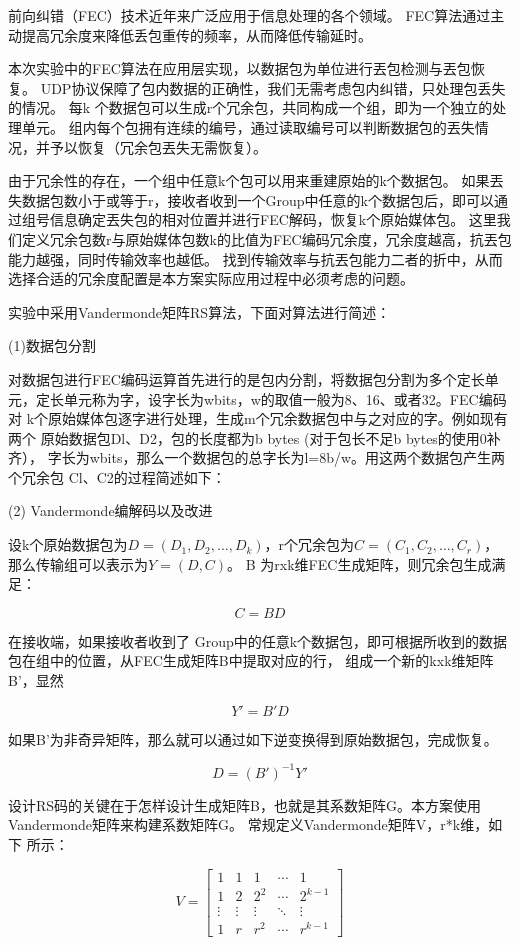 \documentclass[onecolumn]{article}
\begin{document}
\begin{CJK*}{UTF8}{gbsn}
前向纠错（FEC）技术近年来广泛应用于信息处理的各个领域。
FEC算法通过主动提高冗余度来降低丢包重传的频率，从而降低传输延时。

本次实验中的FEC算法在应用层实现，以数据包为单位进行丟包检测与丟包恢复。
UDP协议保障了包内数据的正确性，我们无需考虑包内纠错，只处理包丢失的情况。
每k 个数据包可以生成r个冗余包，共同构成一个组，即为一个独立的处理单元。
组内每个包拥有连续的编号，通过读取编号可以判断数据包的丟失情况，并予以恢复（冗余包丟失无需恢复）。 

由于冗余性的存在，一个组中任意k个包可以用来重建原始的k个数据包。
如果丟失数据包数小于或等于r，接收者收到一个Group中任意的k个数据包后，即可以通过组号信息确定丟失包的相对位置并进行FEC解码，恢复k个原始媒体包。
这里我们定义冗余包数r与原始媒体包数k的比值为FEC编码冗余度，冗余度越高，抗丟包能力越强，同时传输效率也越低。
找到传输效率与抗丟包能力二者的折中，从而 选择合适的冗余度配置是本方案实际应用过程中必须考虑的问题。

实验中采用Vandermonde矩阵RS算法，下面对算法进行简述：

 (1)数据包分割
 
对数据包进行FEC编码运算首先进行的是包内分割，将数据包分割为多个定长单元，定长单元称为字，设字长为wbits，w的取值一般为8、16、或者32。FEC编码对 k个原始媒体包逐字进行处理，生成m个冗余数据包中与之对应的字。例如现有两个 原始数据包Dl、D2，包的长度都为b bytes (对于包长不足b bytes的使用0补齐）， 字长为wbits，那么一个数据包的总字长为l=8b/w。用这两个数据包产生两个冗余包 Cl、C2的过程简述如下：

(2) Vandermonde编解码以及改进

设k个原始数据包为$D= (D_1,D_2,\dots,D_k)$，r个冗余包为$C=(C_1,C_2,\dots,C_r)$，那么传输组可以表示为$Y= (D,C)$。
B 为rxk维FEC生成矩阵，则冗余包生成满足：

$$C=BD$$

在接收端，如果接收者收到了 Group中的任意k个数据包，即可根据所收到的数据包在组中的位置，从FEC生成矩阵B中提取对应的行， 组成一个新的kxk维矩阵B’，显然

$$Y'=B'D$$

如果B’为非奇异矩阵，那么就可以通过如下逆变换得到原始数据包，完成恢复。

$$D=(B')^{-1}Y'$$

设计RS码的关键在于怎样设计生成矩阵B，也就是其系数矩阵G。本方案使用Vandermonde矩阵来构建系数矩阵G。
常规定义Vandermonde矩阵V，r*k维，如下 所示：

$$V=
	\left[ \begin{array}{ccccc}
	1      & 1      & 1      & \cdots & 1       \\
	1      & 2      & 2^2    & \cdots & 2^{k-1} \\
	\vdots & \vdots & \vdots & \ddots & \vdots  \\
	1      & r      & r^2    & \cdots & r^{k-1}
	\end{array} 
	\right ]$$


\end{CJK*}
\end{document}
